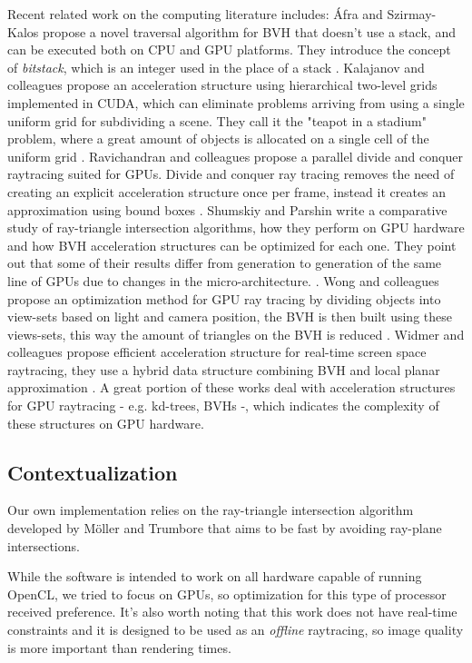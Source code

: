 \documentclass{vgtc}
\begin{document}
Recent related work on the computing literature includes: Áfra and
Szirmay-Kalos propose a novel traversal algorithm for BVH that doesn't
use a stack, and can be executed both on CPU and GPU platforms. They
introduce the concept of \emph{bitstack}, which is an integer used in
the place of a stack \cite{Afra}. Kalajanov and colleagues propose an
acceleration structure using hierarchical two-level grids implemented
in CUDA, which can eliminate problems arriving from using a single
uniform grid for subdividing a scene. They call it the "teapot in a stadium"
problem, where a great amount of objects is allocated on a single
cell of the uniform grid \cite{Kalojanov}. Ravichandran and colleagues
propose a parallel divide and conquer raytracing suited for
GPUs. Divide and conquer ray tracing removes the need of creating an
explicit acceleration structure once per frame, instead it creates an
approximation using bound boxes \cite{Ravichandran}. Shumskiy and
Parshin write a comparative study of ray-triangle intersection
algorithms, how they perform on GPU hardware and how BVH acceleration
structures can be optimized for each one. They point out that some of
their results differ from generation to generation of the same line
of GPUs due to changes in the micro-architecture.
\cite{Shumskiy}. Wong and colleagues propose an optimization method for
GPU ray tracing by dividing objects into view-sets based on light and
camera position, the BVH is then built using these views-sets, this
way the amount of triangles on the BVH is reduced \cite{Wong}. Widmer
and colleagues propose efficient acceleration structure for real-time
screen space raytracing, they use a hybrid data structure combining
BVH and local planar approximation \cite{Widmer}. A great portion of
these works deal with acceleration structures for GPU raytracing -
e.g. kd-trees, BVHs -, which indicates the complexity of these
structures on GPU hardware.


\subsection{Contextualization}

Our own implementation relies on the ray-triangle intersection algorithm
developed by Möller and Trumbore that aims to be fast by avoiding
ray-plane intersections\cite{moller}.

While the software is intended to work on all hardware capable of
running OpenCL, we tried to focus on GPUs, so optimization for this
type of processor received preference. It's also worth noting that
this work does not have real-time constraints and it is designed to be
used as an \emph{offline} raytracing, so image quality is more
important than rendering times.
\end{document}
